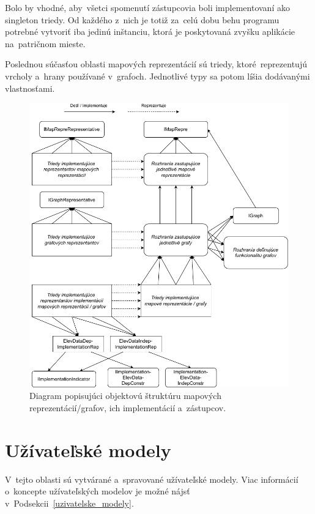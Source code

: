 Bolo by vhodné, aby~všetci spomenutí zástupcovia boli implementovaní ako singleton triedy. Od každého z~nich je totiž za~celú dobu behu programu potrebné vytvoriť iba jedinú inštanciu, ktorá je poskytovaná zvyšku aplikácie na~patričnom mieste.

Poslednou súčasťou oblasti mapových reprezentácií sú triedy, ktoré~reprezentujú vrcholy a~hrany používané v~grafoch. Jednotlivé typy sa potom líšia dodávanými vlastnosťami.   

\begin{figure}[p]\centering
\includegraphics[]{img/mapove_reprezentacie_architektura}
\caption{Diagram popisujúci objektovú štruktúru mapových reprezentácií/grafov, ich implementácií a~zástupcov.} 
\label{obr07:mapove_reprezentacie_architektura}
\end{figure}

\pagebreak

\section{Užívateľské modely}

V~tejto oblasti sú vytvárané a~spravované užívateľské modely. Viac informácií o~koncepte užívateľských modelov je možné nájsť v~Podsekcii~\ref{uzivatelske_modely}.

